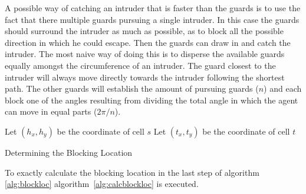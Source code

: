 A possible way of catching an intruder that is faster than the guards is to use the fact that there multiple guards pursuing a single intruder. In this case the guards should surround the intruder as much as possible, as to block all the possible direction in which he could escape. Then the guards can draw in and catch the intruder. The most naive way of doing this is to disperse the available guards equally amongst the circumference of an intruder. The guard closest to the intruder will always move directly towards the intruder following the shortest path. The other guards will establish the amount of pursuing guards ($n$) and each block one of the angles resulting from dividing the total angle in which the agent can move in equal parts ($2\pi / n$)\cite{undeger2009real, undeger2010multi, undeger2007single}.
\label{sec:BES}


		\begin{algorithm}[h!]
			Let $(h_x,h_y)$ be the coordinate of cell $s$\;
			Let $(t_x,t_y)$ be the coordinate of cell $t$\;
			\label{alg:blockloc}
			\caption{Determining the Blocking Location}
		\end{algorithm}

			To exactly calculate the blocking location in the last step of algorithm \ref{alg:blockloc} algorithm~\ref{alg:calcblockloc} is executed.

